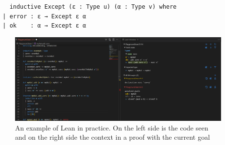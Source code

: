 \begin{lstlisting}
    inductive Except (ε : Type u) (α : Type v) where
  | error : ε → Except ε α
  | ok    : α → Except ε α
\end{lstlisting}

\begin{figure}
    \centering
    \includegraphics[scale=0.4]{Lean_example.png}
    \caption{An example of Lean in practice. On the left side is the code seen and on the right side the context in a proof with the current goal}
\end{figure}
